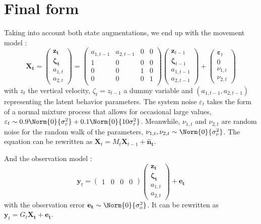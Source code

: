 \section{Final form}
Taking into account both state augmentations, we end up with the movement model :
\begin{equation}
\label{eqn:markov process}
    \mathbf{X_t} =
    \begin{pmatrix}
    \mathbf{z_t}\\\mathbf{\zeta_t}\\ a_{1,t}\\ a_{2,t}
    \end{pmatrix}
    =
    \begin{pmatrix}
    a_{1,t-1}& a_{2,t-1} & 0 & 0\\
    1 & 0 & 0 & 0\\
    0 & 0 & 1 & 0\\
    0 & 0 & 0 & 1\\

    \end{pmatrix}
    \begin{pmatrix}
    \mathbf{z}_{t-1}\\\mathbf{\zeta}_{t-1}\\ a_{1, t-1} \\ a_{2,t-1}
    \end{pmatrix}
    +
    \begin{pmatrix}
    \mathbf{\varepsilon}_t \\ 0 \\ \nu_{1,t} \\\nu_{2,t}
    \end{pmatrix}
\end{equation}
with $z_t$ the vertical velocity, $\zeta_t = z_{t-1}$ a dummy variable and $(a_{1, t-1}, a_{2,t-1})$ representing the latent behavior parameters. The system noise $\varepsilon_t$ takes the form of a normal mixture process that allows for occasional large values, $\varepsilon_t \sim 0.9 \Norm{0}{\sigma_{\varepsilon}^2} + 0.1 \Norm{0}{10\sigma_{\varepsilon}^2}$. Meanwhile, $\nu_{1,t}$ and $\nu_{2,t}$ are random noise for the random walk of the parameters, $\nu_{1,t}, \nu_{2,t} \sim \Norm{0}{\sigma_{\nu}^2}$. The equation can be rewritten as \mbox{$\mathbf{X}_t = M_t \mathbf{X}_{t-1} + \mathbf{\hat{n}_t}$}.

And the observation model :
\begin{equation}
\label{eqn:y sachant X}
    \mathbf{y}_t =
    \begin{pmatrix}
    1 & 0 & 0 & 0
    \end{pmatrix}
    \begin{pmatrix}
        \mathbf{z_t}\\\mathbf{\zeta_t}\\a_{1,t}\\ a_{2,t}
    \end{pmatrix}
    +
    \mathbf{e_t}
\end{equation}
with the observation error $\mathbf{e_t} \sim \Norm{0}{\sigma_{o}^2}$. It can be rewritten as $\mathbf{y}_t = G_t \mathbf{X_t} + \mathbf{e_t}$.

